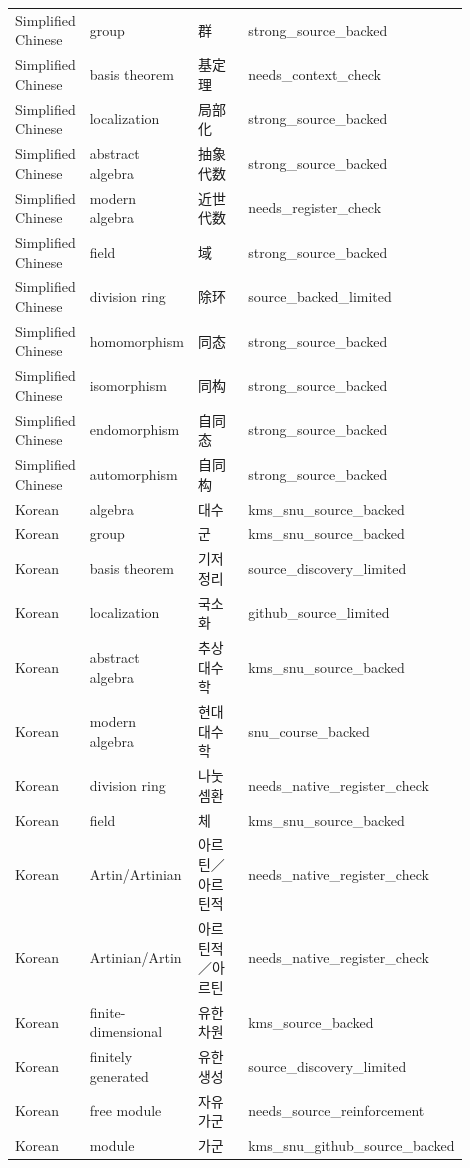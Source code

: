 \documentclass{article}
\begin{document}
\begin{longtable}{p{0.16\linewidth}p{0.22\linewidth}p{0.28\linewidth}p{0.24\linewidth}}
Simplified Chinese & group & 群 & strong\_source\_backed \\
Simplified Chinese & basis theorem & 基定理 & needs\_context\_check \\
Simplified Chinese & localization & 局部化 & strong\_source\_backed \\
Simplified Chinese & abstract algebra & 抽象代数 & strong\_source\_backed \\
Simplified Chinese & modern algebra & 近世代数 & needs\_register\_check \\
Simplified Chinese & field & 域 & strong\_source\_backed \\
Simplified Chinese & division ring & 除环 & source\_backed\_limited \\
Simplified Chinese & homomorphism & 同态 & strong\_source\_backed \\
Simplified Chinese & isomorphism & 同构 & strong\_source\_backed \\
Simplified Chinese & endomorphism & 自同态 & strong\_source\_backed \\
Simplified Chinese & automorphism & 自同构 & strong\_source\_backed \\
Korean & algebra & 대수 & kms\_snu\_source\_backed \\
Korean & group & 군 & kms\_snu\_source\_backed \\
Korean & basis theorem & 기저 정리 & source\_discovery\_limited \\
Korean & localization & 국소화 & github\_source\_limited \\
Korean & abstract algebra & 추상대수학 & kms\_snu\_source\_backed \\
Korean & modern algebra & 현대대수학 & snu\_course\_backed \\
Korean & division ring & 나눗셈환 & needs\_native\_register\_check \\
Korean & field & 체 & kms\_snu\_source\_backed \\
Korean & Artin/Artinian & 아르틴／아르틴적 & needs\_native\_register\_check \\
Korean & Artinian/Artin & 아르틴적／아르틴 & needs\_native\_register\_check \\
Korean & finite-dimensional & 유한 차원 & kms\_source\_backed \\
Korean & finitely generated & 유한 생성 & source\_discovery\_limited \\
Korean & free module & 자유 가군 & needs\_source\_reinforcement \\
Korean & module & 가군 & kms\_snu\_github\_source\_backed \\

\end{longtable}
\end{document}
